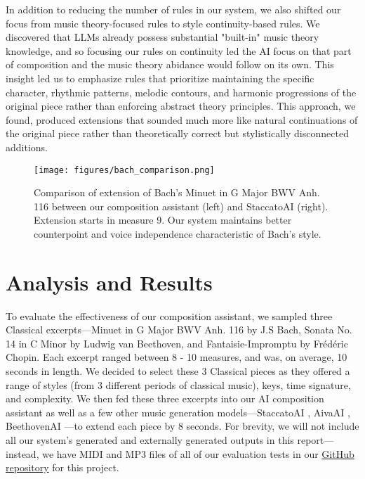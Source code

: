 \documentclass[conference]{IEEEtran}
\begin{document}
In addition to reducing the number of rules in our system, we also shifted our focus from music theory-focused rules to style continuity-based rules. We discovered that LLMs already possess substantial "built-in" music theory knowledge, and so focusing our rules on continuity led the AI focus on that part of composition and the music theory abidance would follow on its own. This insight led us to emphasize rules that prioritize maintaining the specific character, rhythmic patterns, melodic contours, and harmonic progressions of the original piece rather than enforcing abstract theory principles. This approach, we found, produced extensions that sounded much more like natural continuations of the original piece rather than theoretically correct but stylistically disconnected additions. 

\begin{figure*}[t]
    \centering
    \texttt{[image: figures/bach\_comparison.png]}
    \caption{Comparison of extension of Bach's Minuet in G Major BWV Anh. 116 between our composition assistant (left) and StaccatoAI \cite{staccato} (right). Extension starts in measure 9. Our system maintains better counterpoint and voice independence characteristic of Bach's style.}
    \label{fig:bach_comparison}
    \end{figure*} 

\section{Analysis and Results}

To evaluate the effectiveness of our composition assistant, we sampled three Classical excerpts—Minuet in G Major BWV Anh. 116 by J.S Bach, Sonata No. 14 in C Minor by Ludwig van Beethoven, and Fantaisie-Impromptu by Frédéric Chopin. Each excerpt ranged between 8 - 10 measures, and was, on average, 10 seconds in length. We decided to select these 3 Classical pieces as they offered a range of styles (from 3 different periods of classical music), keys, time signature, and complexity. We then fed these three excerpts into our AI composition assistant as well as a few other music generation models—StaccatoAI \cite{staccato}, AivaAI \cite{aiva}, BeethovenAI \cite{beatoven}—to extend each piece by 8 seconds. For brevity, we will not include all our system's generated and externally generated outputs in this report—instead, we have MIDI and MP3 files of all of our evaluation tests in our \href{https://github.com/nathanlim1/ai-composition-assistant}{GitHub repository} for this project. 
\end{document}
